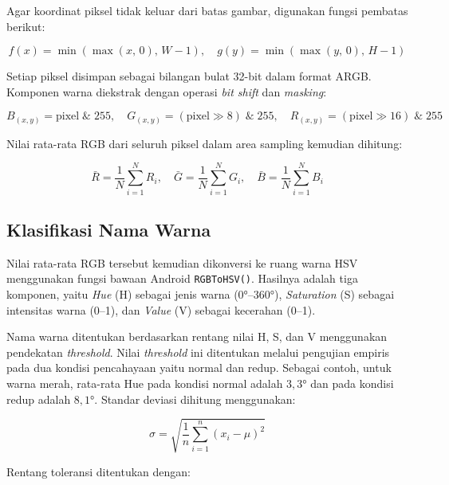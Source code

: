 Agar koordinat piksel tidak keluar dari batas gambar, digunakan fungsi pembatas berikut:

\begin{equation}
  f(x) = \min(\max(x,\, 0),\, W-1), \quad
  g(y) = \min(\max(y,\, 0),\, H-1)
  \label{eq:bounding}
\end{equation}

Setiap piksel disimpan sebagai bilangan bulat 32-bit dalam format ARGB.
Komponen warna diekstrak dengan operasi \textit{bit shift} dan \textit{masking}:

\begin{equation}
  B_{(x,y)} = \text{pixel} \;\&\; 255, \quad
  G_{(x,y)} = (\text{pixel} \gg 8) \;\&\; 255, \quad
  R_{(x,y)} = (\text{pixel} \gg 16) \;\&\; 255
  \label{eq:bit-extract}
\end{equation}

Nilai rata-rata RGB dari seluruh piksel dalam area sampling kemudian dihitung:

\begin{equation}
  \bar{R} = \frac{1}{N}\sum_{i=1}^{N} R_i, \quad
  \bar{G} = \frac{1}{N}\sum_{i=1}^{N} G_i, \quad
  \bar{B} = \frac{1}{N}\sum_{i=1}^{N} B_i
  \label{eq:avg-rgb}
\end{equation}

\subsection{Klasifikasi Nama Warna}

Nilai rata-rata RGB tersebut kemudian dikonversi ke ruang warna HSV menggunakan fungsi bawaan Android \texttt{RGBToHSV()}.
Hasilnya adalah tiga komponen, yaitu \textit{Hue} (H) sebagai jenis warna ($0°$–$360°$), \textit{Saturation} (S) sebagai intensitas warna (0–1), dan \textit{Value} (V) sebagai kecerahan (0–1).

Nama warna ditentukan berdasarkan rentang nilai H, S, dan V menggunakan pendekatan \textit{threshold}.
Nilai \textit{threshold} ini ditentukan melalui pengujian empiris pada dua kondisi pencahayaan yaitu normal dan redup.
Sebagai contoh, untuk warna merah, rata-rata Hue pada kondisi normal adalah $3{,}3°$ dan pada kondisi redup adalah $8{,}1°$.
Standar deviasi dihitung menggunakan:

\begin{equation}
  \sigma = \sqrt{\frac{1}{n}\sum_{i=1}^{n}(x_i - \mu)^2}
  \label{eq:std-dev}
\end{equation}

Rentang toleransi ditentukan dengan:

